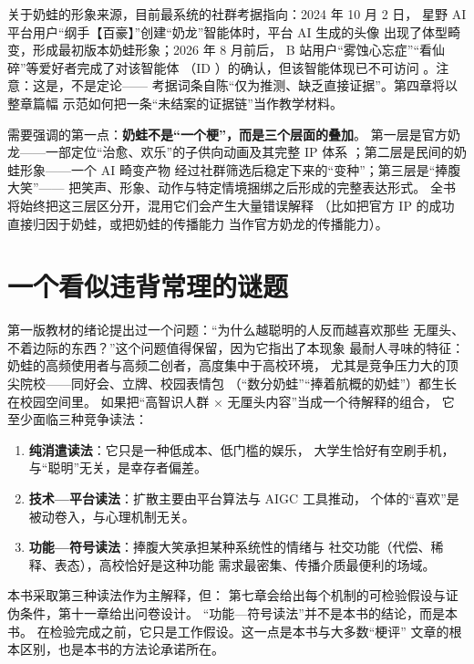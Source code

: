 \begin{nlhistory}[史料与考据]
  关于奶蛙的形象来源，目前最系统的社群考据指向：2024 年 10 月 2 日，
  星野 AI 平台用户“纲手【百豪】”创建“奶龙”智能体时，平台 AI 生成的头像
  出现了体型畸变，形成最初版本奶蛙形象；2026 年 8 月前后，
  B 站用户“雾蚀心忘症”“看仙碎”等爱好者完成了对该智能体
  （ID ）的确认，但该智能体现已不可访问
  \cite{lostmedia2026naiwa}。注意：这是，不是定论——
  考据词条自陈“仅为推测、缺乏直接证据”。第四章将以整章篇幅
  示范如何把一条“未结案的证据链”当作教学材料。
\end{nlhistory}

需要强调的第一点：\textbf{奶蛙不是“一个梗”，而是三个层面的叠加}。
第一层是官方奶龙——一部定位“治愈、欢乐”的子供向动画及其完整 IP 体系
\cite{jiang2026nailong}；第二层是民间的奶蛙形象——一个 AI 畸变产物
经过社群筛选后稳定下来的“变种”；第三层是“捧腹大笑”——
把笑声、形象、动作与特定情境捆绑之后形成的完整表达形式。
全书将始终把这三层区分开，混用它们会产生大量错误解释
（比如把官方 IP 的成功直接归因于奶蛙，或把奶蛙的传播能力
当作官方奶龙的传播能力）。

\section{一个看似违背常理的谜题}\label{sec:01:puzzle}

第一版教材的绪论提出过一个问题：“为什么越聪明的人反而越喜欢那些
无厘头、不着边际的东西？”这个问题值得保留，因为它指出了本现象
最耐人寻味的特征：奶蛙的高频使用者与高频二创者，高度集中于高校环境，
尤其是竞争压力大的顶尖院校——同好会、立牌、校园表情包
（“数分奶蛙”“捧着航概的奶蛙”）都生长在校园空间里。
如果把“高智识人群 × 无厘头内容”当成一个待解释的组合，
它至少面临三种竞争读法：

\begin{enumerate}[label=\arabic*.]
  \item \textbf{纯消遣读法}：它只是一种低成本、低门槛的娱乐，
        大学生恰好有空刷手机，与“聪明”无关，是幸存者偏差。
  \item \textbf{技术—平台读法}：扩散主要由平台算法与 AIGC 工具推动，
        个体的“喜欢”是被动卷入，与心理机制无关。
  \item \textbf{功能—符号读法}：捧腹大笑承担某种系统性的情绪与
        社交功能（代偿、稀释、表态），高校恰好是这种功能
        需求最密集、传播介质最便利的场域。
\end{enumerate}

本书采取第三种读法作为主解释，但：
第七章会给出每个机制的可检验假设与证伪条件，第十一章给出问卷设计。
“功能—符号读法”并不是本书的结论，而是本书。
在检验完成之前，它只是工作假设。这一点是本书与大多数“梗评”
文章的根本区别，也是本书的方法论承诺所在。

